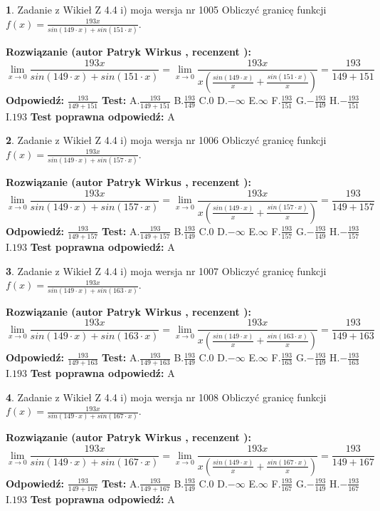 \documentclass[12pt, a4paper]{article}
\theoremstyle{definition} %
\newtheorem{zad}{}
\newcommand{\zadStart}[1]{\begin{zad}#1\newline}
\newcommand{\zadStop}{\end{zad}}
\newcommand{\rozwStart}[2]{\noindent \textbf{Rozwiązanie (autor #1 , recenzent #2): }\newline}
\newcommand{\rozwStop}{\newline}
\newcommand{\odpStart}{\noindent \textbf{Odpowiedź:}\newline}
\newcommand{\odpStop}{\newline}
\newcommand{\testStart}{\noindent \textbf{Test:}\newline}
\newcommand{\testStop}{\newline}
\newcommand{\kluczStart}{\noindent \textbf{Test poprawna odpowiedź:}\newline}
\newcommand{\kluczStop}{\newline}
\begin{document}
\zadStart{Zadanie z Wikieł Z 4.4 i) moja wersja nr 1005}
Obliczyć granicę funkcji $f(x)=\frac{193x}{sin(149\cdot x) +sin(151\cdot x)}$.
\zadStop
\rozwStart{Patryk Wirkus}{}
$$\lim\limits_{x\to 0}\frac{193x}{sin(149\cdot x) +sin(151\cdot x)}=\lim\limits_{x\to 0}\frac{193x}{x(\frac{sin(149\cdot x)}{x}+\frac{sin(151\cdot x)}{x})}=\frac{193}{149+151}$$
\rozwStop
\odpStart
$\frac{193}{149+151}$
\odpStop
\testStart
A.$\frac{193}{149+151}$
B.$\frac{193}{149}$
C.$0$
D.$-\infty$
E.$\infty$
F.$\frac{193}{151}$
G.$-\frac{193}{149}$
H.$-\frac{193}{151}$
I.$193$
\testStop
\kluczStart
A
\kluczStop



\zadStart{Zadanie z Wikieł Z 4.4 i) moja wersja nr 1006}
Obliczyć granicę funkcji $f(x)=\frac{193x}{sin(149\cdot x) +sin(157\cdot x)}$.
\zadStop
\rozwStart{Patryk Wirkus}{}
$$\lim\limits_{x\to 0}\frac{193x}{sin(149\cdot x) +sin(157\cdot x)}=\lim\limits_{x\to 0}\frac{193x}{x(\frac{sin(149\cdot x)}{x}+\frac{sin(157\cdot x)}{x})}=\frac{193}{149+157}$$
\rozwStop
\odpStart
$\frac{193}{149+157}$
\odpStop
\testStart
A.$\frac{193}{149+157}$
B.$\frac{193}{149}$
C.$0$
D.$-\infty$
E.$\infty$
F.$\frac{193}{157}$
G.$-\frac{193}{149}$
H.$-\frac{193}{157}$
I.$193$
\testStop
\kluczStart
A
\kluczStop



\zadStart{Zadanie z Wikieł Z 4.4 i) moja wersja nr 1007}
Obliczyć granicę funkcji $f(x)=\frac{193x}{sin(149\cdot x) +sin(163\cdot x)}$.
\zadStop
\rozwStart{Patryk Wirkus}{}
$$\lim\limits_{x\to 0}\frac{193x}{sin(149\cdot x) +sin(163\cdot x)}=\lim\limits_{x\to 0}\frac{193x}{x(\frac{sin(149\cdot x)}{x}+\frac{sin(163\cdot x)}{x})}=\frac{193}{149+163}$$
\rozwStop
\odpStart
$\frac{193}{149+163}$
\odpStop
\testStart
A.$\frac{193}{149+163}$
B.$\frac{193}{149}$
C.$0$
D.$-\infty$
E.$\infty$
F.$\frac{193}{163}$
G.$-\frac{193}{149}$
H.$-\frac{193}{163}$
I.$193$
\testStop
\kluczStart
A
\kluczStop



\zadStart{Zadanie z Wikieł Z 4.4 i) moja wersja nr 1008}
Obliczyć granicę funkcji $f(x)=\frac{193x}{sin(149\cdot x) +sin(167\cdot x)}$.
\zadStop
\rozwStart{Patryk Wirkus}{}
$$\lim\limits_{x\to 0}\frac{193x}{sin(149\cdot x) +sin(167\cdot x)}=\lim\limits_{x\to 0}\frac{193x}{x(\frac{sin(149\cdot x)}{x}+\frac{sin(167\cdot x)}{x})}=\frac{193}{149+167}$$
\rozwStop
\odpStart
$\frac{193}{149+167}$
\odpStop
\testStart
A.$\frac{193}{149+167}$
B.$\frac{193}{149}$
C.$0$
D.$-\infty$
E.$\infty$
F.$\frac{193}{167}$
G.$-\frac{193}{149}$
H.$-\frac{193}{167}$
I.$193$
\testStop
\kluczStart
A
\kluczStop
\end{document}
